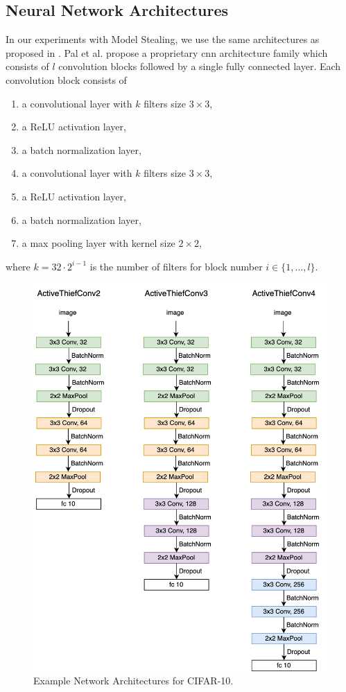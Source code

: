 \subsection{Neural Network Architectures}
\label{sec:Appendix:Architectures}
In our experiments with Model Stealing, we use the same architectures as proposed in \cite{pal2020activethief}. Pal et al. propose a proprietary
\gls{cnn} architecture family which consists of $l$ convolution blocks followed by a single fully connected layer. Each convolution block consists
of 
\begin{enumerate}
    \item a convolutional layer with $k$ filters size $3 \times 3$,
    \item a ReLU activation layer,
    \item a batch normalization layer,
    \item a convolutional layer with $k$ filters size $3 \times 3$,
    \item a ReLU activation layer,
    \item a batch normalization layer,
    \item a max pooling layer with kernel size $2 \times 2$,
\end{enumerate}
where $k=32 \cdot 2^{i-1}$ is the number of filters for block number $i \in \{1,\ldots,l\}$.

\begin{figure}[!htb]
    \centering
    \includegraphics[width=\linewidth]{images/ActiveThiefConvs.png}
    \caption[ActiveThiefConv Architectures]{Example Network Architectures for CIFAR-10.}
    \label{fig:ActiveThiefArchitectures}
\end{figure}



